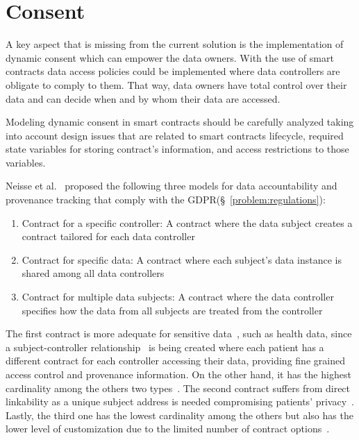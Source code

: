 \section{Consent}
\label{future_work:consent}

A key aspect that is missing from the current solution is the implementation of dynamic consent which can empower the data owners. With the use of smart contracts data access policies could be implemented where data controllers are obligate to comply to them. That way, data owners have total control over their data and can decide when and by whom their data are accessed.

Modeling dynamic consent in smart contracts should be carefully analyzed taking into account design issues that are related to smart contracts lifecycle, required state variables for storing contract’s information, and access restrictions to those variables.

Neisse et al.~\cite{DBLP:journals/corr/NeisseSF17} proposed the following three models for data accountability and provenance tracking that comply with the GDPR(§~\ref{problem:regulations}):

\begin{enumerate}
  \item Contract for a specific controller: A contract where the data subject creates a contract tailored for each data controller
  \item Contract for specific data: A contract where each subject’s data instance is shared among all data controllers
  \item Contract for multiple data subjects: A contract where the data controller specifies how the data from all subjects are treated from the controller
\end{enumerate}

The first contract is more adequate for sensitive data~\cite{DBLP:journals/corr/NeisseSF17}, such as health data, since a subject-controller relationship~\cite{Azaria2016} is being created where each patient has a different contract for each controller accessing their data, providing fine grained access control and provenance information. On the other hand, it has the highest cardinality among the others two types~\cite{DBLP:journals/corr/NeisseSF17}. The second contract suffers from direct linkability as a unique subject address is needed compromising patients’ privacy~\cite{DBLP:journals/corr/NeisseSF17}. Lastly, the third one has the lowest cardinality among the others but also has the lower level of customization due to the limited number of contract options~\cite{DBLP:journals/corr/NeisseSF17}.
